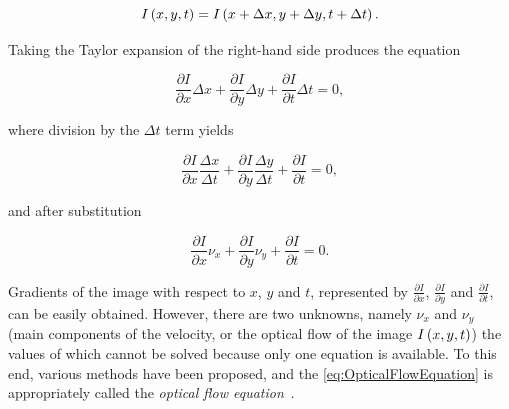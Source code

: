\begin{equation}
    {I} \left( x, y, t \right) = {I} \left( x + \Delta x, y + \Delta y, t + \Delta t \right).
\end{equation}

\noindent Taking the Taylor expansion of the right-hand side produces the equation

\begin{equation}
    \frac{\partial I}{\partial x} \Delta x +
    \frac{\partial I}{\partial y} \Delta y +
    \frac{\partial I}{\partial t} \Delta t =
    0,
\end{equation}

\noindent where division by the $\Delta t$ term yields

\begin{equation}
    \frac{\partial I}{\partial x} \frac{\Delta x}{\Delta t} +
    \frac{\partial I}{\partial y} \frac{\Delta y}{\Delta t} +
    \frac{\partial I}{\partial t} = 0,
\end{equation}

\noindent and after substitution

\begin{equation}
    \label{eq:OpticalFlowEquation}
    \frac{\partial I}{\partial x} \nu_x +
    \frac{\partial I}{\partial y} \nu_y +
    \frac{\partial I}{\partial t} =
    0.
\end{equation}

Gradients of the image with respect to $x$, $y$ and $t$, represented by $\frac{\partial I}{\partial x}$, $\frac{\partial I}{\partial y}$ and $\frac{\partial I}{\partial t}$, can be easily obtained. However, there are two unknowns, namely $\nu_x$ and $\nu_y$ (main components of the velocity, or the optical flow of the image ${I} \left( x, y, t \right)$) the values of which cannot be solved because only one equation is available. To this end, various methods have been proposed, and the \cref{eq:OpticalFlowEquation} is appropriately called the \emph{optical flow equation}~\cite{fleet2006optical}.